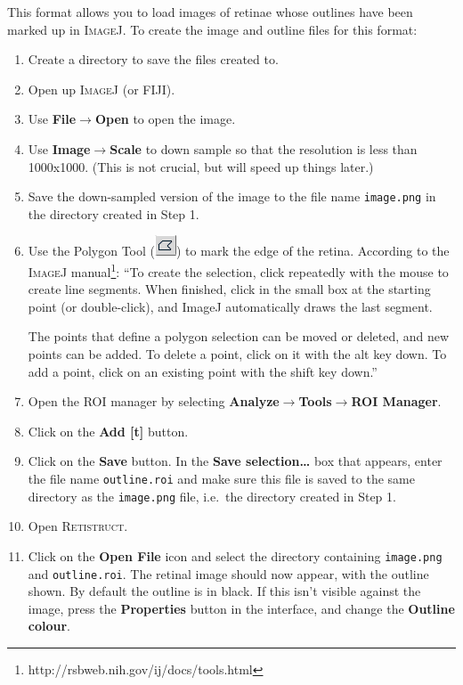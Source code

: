 \documentclass{article}
\begin{document}
This format allows you to load images of retinae whose outlines have
been marked up in \textsc{ImageJ}. To create the image and outline
files for this format:
\begin{enumerate}
\item Create a directory to save the files created to.
\item Open up \textsc{ImageJ} (or FIJI).
\item Use \textbf{File$\rightarrow$Open} to open the image.
\item Use \textbf{Image$\rightarrow$Scale} to down sample so that the
  resolution is less than 1000x1000. (This is not crucial, but will
  speed up things later.)
\item Save the down-sampled version of the image to the file name
  \texttt{image.png} in the directory created in Step 1.
\item Use the Polygon Tool
  (\includegraphics[height=\baselineskip]{poly}) to mark the edge of
  the retina. According to the \textsc{ImageJ}
  manual\footnote{http://rsbweb.nih.gov/ij/docs/tools.html}: ``To
  create the selection, click repeatedly with the mouse to create line
  segments. When finished, click in the small box at the starting
  point (or double-click), and ImageJ automatically draws the last
  segment.

  The points that define a polygon selection can be moved or deleted,
  and new points can be added. To delete a point, click on it with the
  alt key down. To add a point, click on an existing point with the
  shift key down.''
\item Open the ROI manager by selecting
\textbf{Analyze$\rightarrow$Tools$\rightarrow$ROI Manager}.
\item Click on the \textbf{Add [t]} button.
\item Click on the \textbf{Save} button. In the \textbf{Save
selection\dots} box that appears, enter the file name
\texttt{outline.roi} and make sure this file is saved to the same
directory as the \texttt{image.png} file, i.e.\ the directory created
in Step 1.
\item Open \textsc{Retistruct}.
\item Click on the \textbf{Open File} icon and select the directory
containing \texttt{image.png} and \texttt{outline.roi}. The retinal
image should now appear, with the outline shown. By default the
outline is in black. If this isn't visible against the image, press
the \textbf{Properties} button in the interface, and change the
\textbf{Outline colour}.
\end{enumerate}
\end{document}
